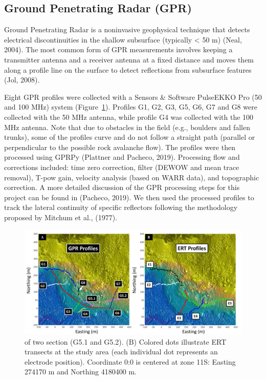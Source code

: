 \documentclass[5p]{elsarticle}
\begin{document}
	\subsection{Ground Penetrating Radar (GPR)}
										
Ground Penetrating Radar is a noninvasive geophysical technique that detects electrical discontinuities in the shallow subsurface (typically < 50 m) (Neal, 2004). The most common form of GPR measurements involves keeping a transmitter antenna and a receiver antenna at a fixed distance and moves them along a profile line on the surface to detect reflections from subsurface features (Jol, 2008). 

Eight GPR profiles were collected with a Sensors \& Software PulseEKKO Pro (50 and 100 MHz) system (Figure~\ref{GPR profile 7}). Profiles G1, G2, G3, G5, G6, G7 and G8 were collected with the 50 MHz antenna, while profile G4 was collected with the 100 MHz antenna. Note that due to obstacles in the field (e.g., boulders and fallen trunks), some of the profiles curve and do not follow a straight path (parallel or perpendicular to the possible rock avalanche flow). The profiles were then processed using GPRPy (Plattner and Pacheco, 2019). Processing flow and corrections included: time zero correction, filter (DEWOW and mean trace removal), T-pow gain, velocity analysis (based on WARR data), and topographic correction. A more detailed discussion of the GPR processing steps for this project can be found in (Pacheco, 2019). We then used the processed profiles to track the lateral continuity of specific reflectors following the methodology proposed by Mitchum et al., (1977). 

											\begin{figure}[h]

	\includegraphics[width=\textwidth]{Figures/GPR_ERT_Map.pdf}
		\caption{of two section (G5.1 and G5.2). (B) Colored dots illustrate ERT transects at the study area (each individual dot represents an electrode position). Coordinate 0:0 is centered at zone 11S: Easting 274170 m and Northing 4180400 m.  \label{GPR profile 7}}

											\end{figure}										
											
\end{document}

